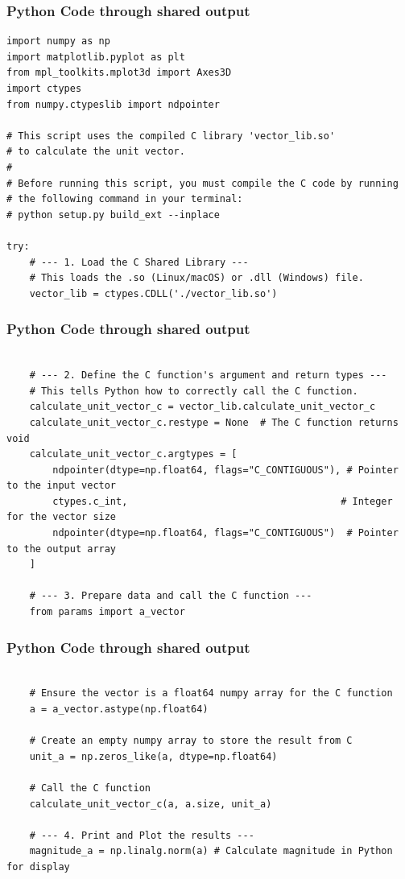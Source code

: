 \documentclass{beamer}
\begin{document}
\begin{frame}[fragile]
\frametitle{Python Code through shared output}
\begin{lstlisting}
import numpy as np
import matplotlib.pyplot as plt
from mpl_toolkits.mplot3d import Axes3D
import ctypes
from numpy.ctypeslib import ndpointer

# This script uses the compiled C library 'vector_lib.so' 
# to calculate the unit vector.
#
# Before running this script, you must compile the C code by running
# the following command in your terminal:
# python setup.py build_ext --inplace

try:
    # --- 1. Load the C Shared Library ---
    # This loads the .so (Linux/macOS) or .dll (Windows) file.
    vector_lib = ctypes.CDLL('./vector_lib.so') 
    \end{lstlisting}
\end{frame}  

\begin{frame}[fragile]
\frametitle{Python Code through shared output}
\begin{lstlisting}
    
    # --- 2. Define the C function's argument and return types ---
    # This tells Python how to correctly call the C function.
    calculate_unit_vector_c = vector_lib.calculate_unit_vector_c
    calculate_unit_vector_c.restype = None  # The C function returns void
    calculate_unit_vector_c.argtypes = [
        ndpointer(dtype=np.float64, flags="C_CONTIGUOUS"), # Pointer to the input vector
        ctypes.c_int,                                     # Integer for the vector size
        ndpointer(dtype=np.float64, flags="C_CONTIGUOUS")  # Pointer to the output array
    ]

    # --- 3. Prepare data and call the C function ---
    from params import a_vector
    \end{lstlisting}
\end{frame}  

\begin{frame}[fragile]
\frametitle{Python Code through shared output}
\begin{lstlisting}
    
    # Ensure the vector is a float64 numpy array for the C function
    a = a_vector.astype(np.float64)
    
    # Create an empty numpy array to store the result from C
    unit_a = np.zeros_like(a, dtype=np.float64)

    # Call the C function
    calculate_unit_vector_c(a, a.size, unit_a)

    # --- 4. Print and Plot the results ---
    magnitude_a = np.linalg.norm(a) # Calculate magnitude in Python for display
    \end{lstlisting}
\end{frame}  
\end{document}
